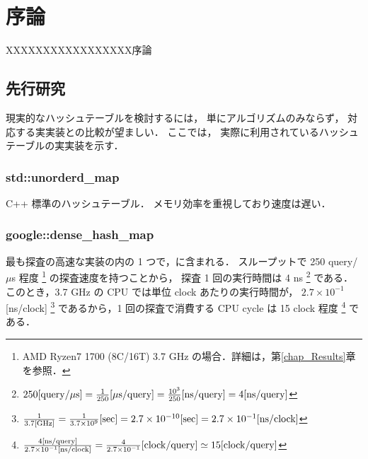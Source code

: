 \chapter{序論}
\label{chap_Introduction}

XXXXXXXXXXXXXXXXX序論


\section{先行研究}
現実的なハッシュテーブルを検討するには，
単にアルゴリズムのみならず，
対応する実実装との比較が望ましい．
ここでは，
実際に利用されているハッシュテーブルの実実装を示す．

\subsection{std::unorderd\_map}
C++ 標準のハッシュテーブル．
メモリ効率を重視しており速度は遅い．

\subsection{google::dense\_hash\_map}
最も探査の高速な実装の内の 1 つで，\cite{sparsehash2005}に含まれる．
スループットで 250 query/$\mu$s 程度
\footnote{AMD Ryzen7 1700 (8C/16T) 3.7 GHz の場合．詳細は，第\ref{chap_Results}章を参照．}
の探査速度を持つことから，
探査 1 回の実行時間は 4 ns
\footnote{
  $
    250{\rm [query \slash \mu s]}
    = \frac{1}{250} {\rm [\mu s \slash query]}
    = \frac{10^3}{250} {\rm [ns \slash query]}
    = 4 {\rm [ns \slash query]}
  $
}
である．このとき，3.7 GHz の CPU では単位 clock あたりの実行時間が，
$2.7 \times 10^{-1}$ [ns/clock]
\footnote{
  $
    \frac{1}{3.7 {\rm [GHz]}}
    = \frac{1}{3.7 \times 10^9}{\rm [sec]}
    = 2.7 \times 10^{-10}{\rm [sec]}
    = 2.7 \times 10^{-1}{\rm [ns/clock]}
  $
}
であるから，1 回の探査で消費する CPU cycle は
15 clock 程度
\footnote{
  $
    \frac{ 4 {\rm [ns/query]} }{ 2.7 \times 10^{-1} {\rm [ns/clock]} }
    = \frac{ 4 }{ 2.7 \times 10^{-1} } {\rm [clock/query]}
    \simeq 15 {\rm [clock/query]}
  $
}
である．

